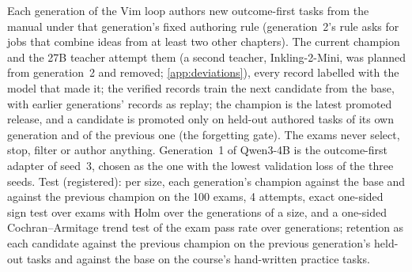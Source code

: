 Each generation of the Vim loop authors new outcome-first tasks from the manual under that generation's fixed authoring rule
(generation~2's rule asks for jobs that combine ideas from at least two other chapters). The current champion and the 27B teacher attempt them
(a second teacher, Inkling-2-Mini, was planned from generation~2 and removed; \cref{app:deviations}), every record labelled with the model that made it; the verified
records train the next candidate from the base, with earlier generations' records as replay; the champion is the latest promoted release, and a candidate is promoted only on
held-out authored tasks of its own generation and of the previous one (the forgetting gate). The exams never select, stop,
filter or author anything. Generation~1 of Qwen3-4B is the outcome-first adapter of seed~3, chosen as the one with the lowest
validation loss of the three seeds. Test (registered): per size, each generation's champion against the base and against the
previous champion on the 100 exams, 4 attempts, exact one-sided sign test over exams with Holm over the generations of a size,
and a one-sided Cochran--Armitage trend test of the exam pass rate over generations; retention as each candidate against the
previous champion on the previous generation's held-out tasks and against the base on the course's hand-written practice tasks.
